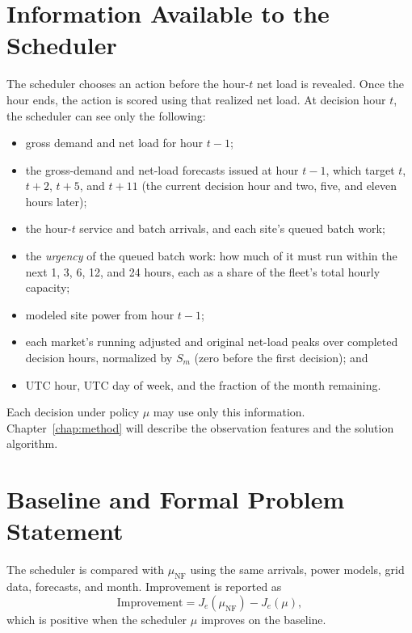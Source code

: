 \documentclass{UNCC-thesis}
\begin{document}
\section{Information Available to the Scheduler}
\label{subsec:problem-causality}

The scheduler chooses an action before the hour-\(t\) net load is revealed.
Once the hour ends, the action is scored using that realized net load.
At decision hour \(t\), the scheduler can see only the following:
\begin{itemize}
  \item gross demand and net load for hour \(t-1\);
  \item the gross-demand and net-load forecasts issued at hour \(t-1\),
        which target \(t\), \(t+2\), \(t+5\), and \(t+11\) (the current
        decision hour and two, five, and eleven hours later);
  \item the hour-\(t\) service and batch arrivals, and each site's queued
        batch work;
  \item the \emph{urgency} of the queued batch work: how much of it must run
        within the next 1, 3, 6, 12, and 24 hours, each as a share of the
        fleet's total hourly capacity;
  \item modeled site power from hour \(t-1\);
  \item each market's running adjusted and original net-load peaks over
        completed decision hours, normalized by \(S_m\) (zero before the
        first decision); and
  \item UTC hour, UTC day of week, and the fraction of the month remaining.
\end{itemize}

Each decision under policy \(\mu\) may use only this information. Chapter~\ref{chap:method} will describe the observation features and
the solution algorithm.

\section{Baseline and Formal Problem Statement}
\label{subsec:problem-evaluation}

The scheduler is compared with \(\mu_{\mathrm{NF}}\) using
the same arrivals, power models, grid data, forecasts, and month. Improvement
is reported as
\begin{equation}
  \text{Improvement}
  =
  J_e(\mu_{\mathrm{NF}})-J_e(\mu),
  \label{eq:improvement}
\end{equation}
which is positive when the scheduler \(\mu\) improves on the baseline.
\end{document}
